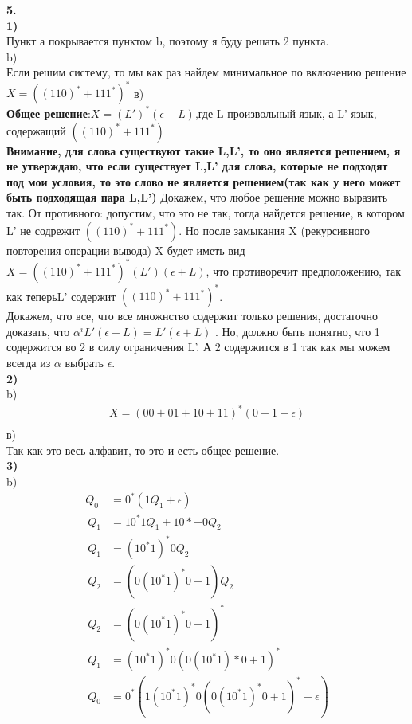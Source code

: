 \documentclass[a4paper,12pt]{article}
\begin{document}
\textbf{5.}\\
\textbf{1)}\\
Пункт а покрывается пунктом b, поэтому я буду решать 2 пункта.\\
b)\\
Если решим систему, то мы как раз найдем минимальное по включению решение\\
$X=((110)^*+111^*)^*$
в)\\
\textbf{Общее решение}:$X=(L')^*(\epsilon+L)$,где L  произвольный язык, а L'-язык, содержащий $((110)^*+111^*)$\\
\textbf{Внимание, для слова существуют такие L,L', то оно является решением, я не утверждаю, что если существует L,L' для слова, которые не подходят под мои условия, то это слово не является решением(так как у него может быть подходящая пара L,L')}
Докажем, что любое решение можно выразить так. От противного: допустим, что это не так, тогда найдется решение, в котором L' не содрежит $((110)^*+111^*)$. Но после замыкания X (рекурсивного повторения операции вывода) X будет иметь вид $X=((110)^*+111^*)^*(L')(\epsilon+L)$, что противоречит предположению, так как теперьL' содержит $((110)^*+111^*)^*$.\\
Докажем, что все, что все множнство содержит только решения, достаточно доказать, что $\alpha^iL'(\epsilon+L)=L'(\epsilon+L)$ . Но, должно быть понятно, что 1 содержится во 2 в силу ограничения L'. А 2 содержится в 1 так как мы можем всегда из $\alpha$  выбрать $\epsilon$.\\
\textbf{2)}\\
b)\\
\begin{align*}
	X=(00+01+10+11)^*(0+1+\epsilon)\\\
\end{align*}
в)\\
Так как это весь алфавит, то это и есть общее решение.\\
\textbf{3)}\\
b)\\
\begin{align*}
	Q_0&=0^*(1Q_1+\epsilon)\\\
	Q_1&=10^*1Q_1+10*+0Q_2\\\
	Q_1&=(10^*1)^*0Q_2\\\
	Q_2&=(0(10^*1)^*0+1)Q_2\\\
	Q_2&=(0(10^*1)^*0+1)^*\\\
	Q_1&=(10^*1)^*0(0(10^*1)*0+1)^*\\\
	Q_0&=0^*(1(10^*1)^*0(0(10^*1)^*0+1)^*+\epsilon)\\\
\end{align*}
\end{document}
